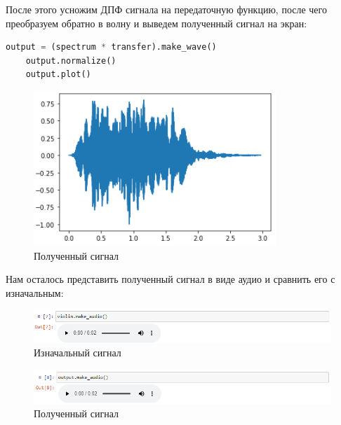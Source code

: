 \documentclass[a4paper]{article}
\begin{document}
            После этого усножим ДПФ сигнала на передаточную функцию, после чего преобразуем обратно в волну и выведем полученный сигнал на экран:
            
\begin{lstlisting}[language=Python, caption= Преобразование сигнала]
    output = (spectrum * transfer).make_wave()
    output.normalize()
    output.plot()
\end{lstlisting}
            
            \begin{figure}[H]
                \centering
                \includegraphics{ex_1_5.png}
                \caption{Полученный сигнал}
                \label{fig:ex_1_5}
            \end{figure}
            
            Нам осталось представить полученный сигнал в виде аудио и сравнить его с изначальным:
            
            \begin{figure}[H]
                \centering
                \includegraphics[width=\textwidth]{ex_1_6.png}
                \caption{Изначальный сигнал}
                \label{fig:ex_1_6}
            \end{figure}
            
            \begin{figure}[H]
                \centering
                \includegraphics[width=\textwidth]{ex_1_7.png}
                \caption{Полученный сигнал}
                \label{fig:ex_1_7}
            \end{figure}
            
\end{document}

